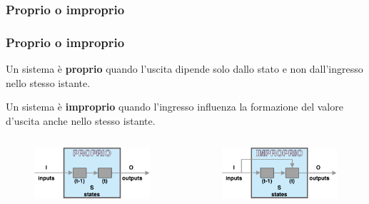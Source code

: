 \subsubsection[Proprio o improprio]{Proprio o improprio}
\begin{frame}
	\frametitle{Proprio o improprio}
	\begin{block}{Un sistema è \textbf{proprio}}
		quando l'uscita dipende solo dallo stato e non dall'ingresso nello stesso istante.
	\end{block}
	
	\begin{block}{Un sistema è \textbf{improprio}}
		quando l'ingresso influenza la formazione del valore d'uscita anche nello stesso istante.
	\end{block}
	
	\begin{columns}			
		\begin{figure}[!htbp] 
			\centering
			\includegraphics[width=1.0\linewidth]{images/1_i_sistemi/systemProprio.pdf}
		\end{figure}
					
		\begin{figure}[!htbp] 
			\centering
			\includegraphics[width=1.0\linewidth]{images/1_i_sistemi/systemImproprio.pdf}
		\end{figure}
		
	\end{columns}
	
\end{frame}


